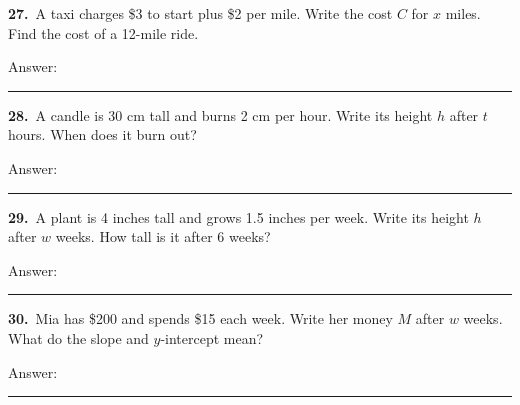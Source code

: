 \documentclass[11pt,letterpaper]{article}
\begin{document}
\needspace{3.7cm}\par\vspace{3mm}\noindent \begin{minipage}[t][3.2cm]{0.48\linewidth}\raggedright{\color{fmturn}\bfseries 27.}\ A taxi charges \$3 to start plus \$2 per mile. Write the cost $C$ for $x$ miles. Find the cost of a 12-mile ride.\par\vfill\hfill Answer:\ \rule{3.2cm}{0.4pt}\end{minipage}\hfill \begin{minipage}[t][3.2cm]{0.48\linewidth}\raggedright{\color{fmturn}\bfseries 28.}\ A candle is 30 cm tall and burns 2 cm per hour. Write its height $h$ after $t$ hours. When does it burn out?\par\vfill\hfill Answer:\ \rule{3.2cm}{0.4pt}\end{minipage}\par
\needspace{3.7cm}\par\vspace{3mm}\noindent \begin{minipage}[t][3.2cm]{0.48\linewidth}\raggedright{\color{fmturn}\bfseries 29.}\ A plant is 4 inches tall and grows 1.5 inches per week. Write its height $h$ after $w$ weeks. How tall is it after 6 weeks?\par\vfill\hfill Answer:\ \rule{3.2cm}{0.4pt}\end{minipage}\hfill \begin{minipage}[t][3.2cm]{0.48\linewidth}\raggedright{\color{fmturn}\bfseries 30.}\ Mia has \$200 and spends \$15 each week. Write her money $M$ after $w$ weeks. What do the slope and $y$-intercept mean?\par\vfill\hfill Answer:\ \rule{3.2cm}{0.4pt}\end{minipage}\par
\end{document}
